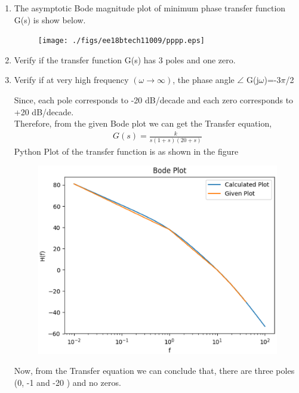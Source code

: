 \begin{enumerate}[label=\thesubsection.\arabic*.,ref=\thesubsection.\theenumi]
\item 
The asymptotic Bode magnitude plot of  minimum phase transfer function
G(s) is show below.\\
\begin{figure}[htp]
	\centering
	\texttt{[image: ./figs/ee18btech11009/pppp.eps]}
	\caption{}
	\label{fig:galaxy}
\end{figure} 
\item Verify if the transfer function G(s) has 3 poles and one zero.
\item  Verify if at very high frequency $(\omega \to \infty)$, the phase angle $\angle$ G(j$\omega$)=-3$\pi$/2 \\
\solution

Since, each pole corresponds to -20 dB/decade  
and each zero corresponds to +20 dB/decade.\\
Therefore, from the given Bode plot we can get the Transfer equation,
\begin{align}
G(s) = \frac{k}{s(1+s)(20+s)}
\end{align}
Python Plot of the transfer function is as shown in the figure 
\begin{figure}[htp]
	\centering
	\includegraphics[width=1 \columnwidth]{./figs/ee18btech11009/bode.eps}
	\caption{}
	\label{fig:bode}
\end{figure} 

Now, from the Transfer equation we can conclude that,
there are three poles (0, -1 and -20 ) and no zeros.\\


\end{enumerate}
